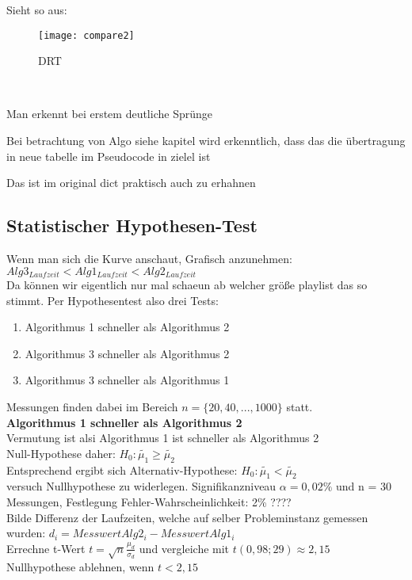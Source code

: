 \documentclass[
10pt, %
a4paper, %
oneside, %
headinclude,footinclude, %
BCOR5mm, %
]{scrartcl}
\begin{document}
Sieht so aus:

\begin{figure}[h!]
	\centering 
	\texttt{[image: compare2]} 
	\caption[DRT]{DRT}
\end{figure}\

Man erkennt bei erstem deutliche Sprünge


Bei betrachtung von Algo siehe kapitel wird erkenntlich, dass das die übertragung in neue tabelle im Pseudocode in zielel ist

Das ist im original dict praktisch auch zu erhahnen 



\subsection{Statistischer Hypothesen-Test}

Wenn man sich die Kurve anschaut, Grafisch anzunehmen:\\
\(Alg3_{Laufzeit} < Alg1_{Laufzeit} < Alg2_{Laufzeit}\)\\

Da können wir eigentlich nur mal schaeun ab welcher größe playlist das so stimmt.
Per Hypothesentest also drei Tests:\\
\begin{enumerate}[noitemsep]
	\item Algorithmus 1 schneller als Algorithmus 2
	\item Algorithmus 3 schneller als Algorithmus 2
	\item Algorithmus 3 schneller als Algorithmus 1
\end{enumerate}

Messungen finden dabei im Bereich \(n = \{20,40,...,1000\}\) statt.\\


\textbf{Algorithmus 1 schneller als Algorithmus 2}\\
Vermutung ist alsi Algorithmus 1 ist schneller als Algorithmus 2\\
Null-Hypothese daher: \(H_0: \tilde{ \mu_1 } \ge \tilde{\mu_2} \) \\
Entsprechend ergibt sich Alternativ-Hypothese: \(H_0: \tilde{ \mu_1 } < \tilde{\mu_2} \) \\
versuch Nullhypothese zu widerlegen. Signifikanzniveau \(\alpha = 0,02\%\)  und n = 30 Messungen, Festlegung Fehler-Wahrscheinlichkeit: 2\% ???? \\
Bilde Differenz der Laufzeiten, welche auf selber Probleminstanz gemessen wurden: \(d_i = MesswertAlg2_i - MesswertAlg1_i\)\\
Errechne t-Wert \(t=\sqrt{n}\frac{\mu_d}{\sigma_d} \) und vergleiche mit \(t(0,98;29)\approx2,15\)\\
Nullhypothese ablehnen, wenn \(t<2,15\)\\
\end{document}
